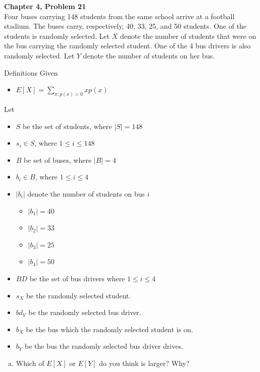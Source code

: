 \documentclass{article}
\begin{document}
\begin{spacing}{1.1}
\newpage
\begin{homeworkProblem}
  {\bf Chapter 4, Problem 21}\\
  Four buses carrying 148 students from the same school arrive at 
  a football stadium. The buses carry, respectively, 40, 33, 25, 
  and 50 students. One of the students is randomly selected. 
  Let $X$ denote the number of students that were on the bus carrying 
  the randomly selected student. One of the 4 bus drivers is also 
  randomly selected. Let $Y$ denote the number of students on her bus.
  \begin{homeworkSection}{Definitions}
    Given
      \begin{itemize}
        \item $E[ X] = \sum\limits_{x:p( x) > 0}{ x p( x)}$
      \end{itemize}
    Let
      \begin{itemize}
        \item $S$ be the set of students, where $|S| = 148$
        \item $s_i \in S$, where $1 \le i \le 148$
        \item $B$ be set of buses, where $|B| = 4$
        \item $b_i \in B$, where $1 \le i \le 4$
        \item $|b_i|$ denote the number of students on bus $i$
          \begin{itemize}
            \item $|b_1| = 40$
            \item $|b_2| = 33$
            \item $|b_3| = 25$
            \item $|b_4| = 50$
          \end{itemize}
        \item $BD$ be the set of bus drivers where $1 \le i \le 4$
        \item $s_X$ be the randomly selected student.
        \item $bd_Y$ be the randomly selected bus driver.
        \item $b_X$ be the bus which the randomly selected student is on.
        \item $b_Y$ be the bus the randomly selected bus driver drives.
      \end{itemize}
  \end{homeworkSection}
  \begin{enumerate}[(a)]
    \item Which of $E[ X]$ or $E[ Y]$ do you think is larger? Why?

\end{enumerate}
\end{homeworkProblem}
\end{spacing}
\end{document}

